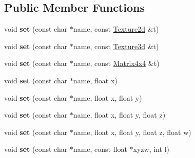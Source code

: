 \subsection*{Public Member Functions}
\begin{DoxyCompactItemize}
\item 
\hypertarget{class_tempest_1_1_shader_input_ab8cfc100daac2d3777fcc4135bd3a5ef}{void {\bfseries set} (const char $\ast$name, const \hyperlink{class_tempest_1_1_texture2d}{Texture2d} \&t)}\label{class_tempest_1_1_shader_input_ab8cfc100daac2d3777fcc4135bd3a5ef}

\item 
\hypertarget{class_tempest_1_1_shader_input_aee71892be63d269a020af278a7c0fbfb}{void {\bfseries set} (const char $\ast$name, const \hyperlink{class_tempest_1_1_texture3d}{Texture3d} \&t)}\label{class_tempest_1_1_shader_input_aee71892be63d269a020af278a7c0fbfb}

\item 
\hypertarget{class_tempest_1_1_shader_input_aee3d3c71a6e8abadd0df520b0c920277}{void {\bfseries set} (const char $\ast$name, const \hyperlink{class_tempest_1_1_matrix4x4}{Matrix4x4} \&t)}\label{class_tempest_1_1_shader_input_aee3d3c71a6e8abadd0df520b0c920277}

\item 
\hypertarget{class_tempest_1_1_shader_input_a61bbb6d135d32a9a23a7e3b8e563cf70}{void {\bfseries set} (const char $\ast$name, float x)}\label{class_tempest_1_1_shader_input_a61bbb6d135d32a9a23a7e3b8e563cf70}

\item 
\hypertarget{class_tempest_1_1_shader_input_a5a6ebfeff8f82e693f79a9fa320adccc}{void {\bfseries set} (const char $\ast$name, float x, float y)}\label{class_tempest_1_1_shader_input_a5a6ebfeff8f82e693f79a9fa320adccc}

\item 
\hypertarget{class_tempest_1_1_shader_input_a739d3d9b250f7331d503bb23b5c9891b}{void {\bfseries set} (const char $\ast$name, float x, float y, float z)}\label{class_tempest_1_1_shader_input_a739d3d9b250f7331d503bb23b5c9891b}

\item 
\hypertarget{class_tempest_1_1_shader_input_a2e0daf28a12bf86a05f9cc956e06198a}{void {\bfseries set} (const char $\ast$name, float x, float y, float z, float w)}\label{class_tempest_1_1_shader_input_a2e0daf28a12bf86a05f9cc956e06198a}

\item 
\hypertarget{class_tempest_1_1_shader_input_ad1721bb7a7783b414be287ee7ab07890}{void {\bfseries set} (const char $\ast$name, const float $\ast$xyzw, int l)}\label{class_tempest_1_1_shader_input_ad1721bb7a7783b414be287ee7ab07890}


\end{DoxyCompactItemize}
